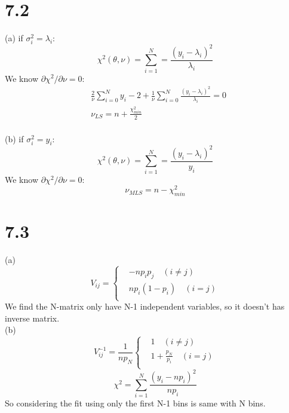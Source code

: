 \documentclass{article}
\begin{document}
\begin{CJK*}{GBK}{song}
\section{7.2}
(a)
if $\sigma_i^2=\lambda_i$:
\begin{equation}
\chi^2(\theta,\nu)=\sum_{i=1}^N=\frac{(y_i-\lambda_i)^2}{\lambda_i}
\end{equation}
We know $\partial{\chi^2}/\partial{\nu}=0$:
\begin{equation}
\begin{aligned}
&\frac{2}{\nu}\sum_{i=0}^Ny_i-2+\frac{1}{\nu}\sum_{i=0}^N\frac{(y_i-\lambda_i)^2}{\lambda_i}=0\\
&\nu_{LS}=n+\frac{\chi_{min}^2}{2}\\
\end{aligned}
\end{equation}


(b)
if $\sigma_i^2=y_i$:
\begin{equation}
\chi^2(\theta,\nu)=\sum_{i=1}^N=\frac{(y_i-\lambda_i)^2}{y_i}
\end{equation}
We know $\partial{\chi^2}/\partial{\nu}=0$:
\begin{equation}
\nu_{MLS}=n-\chi_{min}^2
\end{equation}

\section{7.3}
(a)
\begin{equation}
V_{ij}=\left\{
\begin{aligned}
 & -np_ip_j\quad(i\neq j) \\
 & np_i(1-p_i)\quad(i=j) \\
\end{aligned}
\right.
\end{equation}
We find the N-matrix only have N-1 independent variables, so it doesn't has inverse matrix.\\
(b)
\begin{equation}
V^{-1}_{ij}=\frac{1}{np_N}\left\{
\begin{aligned}
 & 1\quad(i\neq j) \\
 & 1+\frac{p_N}{p_i}\quad(i=j) \\
\end{aligned}
\right.
\end{equation}
\begin{equation}
\chi^2=\sum_{i=1}^N\frac{(y_i-np_i)^2}{np_i}
\end{equation}
So considering the fit using only the  first N-1 bins is same with N bins.




\end{CJK*}
\end{document}
